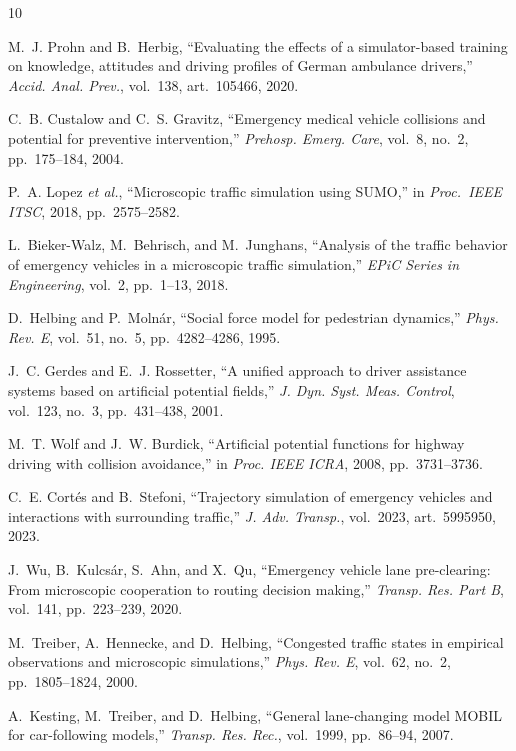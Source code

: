 \documentclass[conference,a4paper]{IEEEtran}
\begin{document}
\balance
\begin{thebibliography}{10}\setlength{\itemsep}{0pt}\footnotesize

 M.~J. Prohn and B.~Herbig, ``Evaluating the effects of a
simulator-based training on knowledge, attitudes and driving profiles of German
ambulance drivers,'' \emph{Accid. Anal. Prev.}, vol.~138, art.~105466, 2020.

 C.~B. Custalow and C.~S. Gravitz, ``Emergency medical
vehicle collisions and potential for preventive intervention,'' \emph{Prehosp.
Emerg. Care}, vol.~8, no.~2, pp.~175--184, 2004.

 P.~A. Lopez \emph{et al.}, ``Microscopic traffic simulation
using SUMO,'' in \emph{Proc.\ IEEE ITSC}, 2018, pp.~2575--2582.

 L.~Bieker-Walz, M.~Behrisch, and M.~Junghans, ``Analysis of
the traffic behavior of emergency vehicles in a microscopic traffic
simulation,'' \emph{EPiC Series in Engineering}, vol.~2, pp.~1--13, 2018.

 D.~Helbing and P.~Moln\'ar, ``Social force model for
pedestrian dynamics,'' \emph{Phys. Rev. E}, vol.~51, no.~5, pp.~4282--4286, 1995.

 J.~C. Gerdes and E.~J. Rossetter, ``A unified approach to
driver assistance systems based on artificial potential fields,'' \emph{J. Dyn.
Syst. Meas. Control}, vol.~123, no.~3, pp.~431--438, 2001.

 M.~T. Wolf and J.~W. Burdick, ``Artificial potential functions
for highway driving with collision avoidance,'' in \emph{Proc. IEEE ICRA}, 2008,
pp.~3731--3736.

 C.~E. Cort\'es and B.~Stefoni, ``Trajectory simulation of
emergency vehicles and interactions with surrounding traffic,'' \emph{J. Adv.
Transp.}, vol.~2023, art.~5995950, 2023.

 J.~Wu, B.~Kulcs\'ar, S.~Ahn, and X.~Qu, ``Emergency vehicle lane
pre-clearing: From microscopic cooperation to routing decision making,''
\emph{Transp. Res. Part B}, vol.~141, pp.~223--239, 2020.

 M.~Treiber, A.~Hennecke, and D.~Helbing, ``Congested traffic
states in empirical observations and microscopic simulations,'' \emph{Phys. Rev.
E}, vol.~62, no.~2, pp.~1805--1824, 2000.

 A.~Kesting, M.~Treiber, and D.~Helbing, ``General
lane-changing model MOBIL for car-following models,'' \emph{Transp. Res. Rec.},
vol.~1999, pp.~86--94, 2007.


\end{thebibliography}
\end{document}
